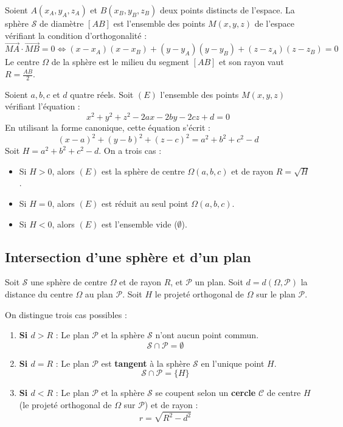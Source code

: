 \begin{theoreme}
Soient $A(x_A, y_A, z_A)$ et $B(x_B, y_B, z_B)$ deux points distincts de l'espace.
La sphère $\mathcal{S}$ de diamètre $[AB]$ est l'ensemble des points $M(x, y, z)$ de l'espace vérifiant la condition d'orthogonalité :
\[
\vec{MA} \cdot \vec{MB} = 0 \iff (x - x_A)(x - x_B) + (y - y_A)(y - y_B) + (z - z_A)(z - z_B) = 0
\]
Le centre $\Omega$ de la sphère est le milieu du segment $[AB]$ et son rayon vaut $R = \frac{AB}{2}$.
\end{theoreme}

\begin{propriete}[Détermination géométrique de l'ensemble $x^2 + y^2 + z^2 - 2ax - 2by - 2cz + d = 0$]
Soient $a, b, c$ et $d$ quatre réels. Soit $(E)$ l'ensemble des points $M(x, y, z)$ vérifiant l'équation :
\[
x^2 + y^2 + z^2 - 2ax - 2by - 2cz + d = 0
\]
En utilisant la forme canonique, cette équation s'écrit :
\[
(x - a)^2 + (y - b)^2 + (z - c)^2 = a^2 + b^2 + c^2 - d
\]
Soit $H = a^2 + b^2 + c^2 - d$. On a trois cas :
\begin{itemize}
    \item Si $H > 0$, alors $(E)$ est la sphère de centre $\Omega(a, b, c)$ et de rayon $R = \sqrt{H}$.
    \item Si $H = 0$, alors $(E)$ est réduit au seul point $\Omega(a, b, c)$.
    \item Si $H < 0$, alors $(E)$ est l'ensemble vide ($\emptyset$).
\end{itemize}
\end{propriete}

\subsection{Intersection d'une sphère et d'un plan}

Soit $\mathcal{S}$ une sphère de centre $\Omega$ et de rayon $R$, et $\mathcal{P}$ un plan. Soit $d = d(\Omega, \mathcal{P})$ la distance du centre $\Omega$ au plan $\mathcal{P}$.
Soit $H$ le projeté orthogonal de $\Omega$ sur le plan $\mathcal{P}$.

\begin{theoreme}
On distingue trois cas possibles :
\begin{enumerate}
    \item \textbf{Si $d > R$} : Le plan $\mathcal{P}$ et la sphère $\mathcal{S}$ n'ont aucun point commun.
    \[
    \mathcal{S} \cap \mathcal{P} = \emptyset
    \]
    \item \textbf{Si $d = R$} : Le plan $\mathcal{P}$ est \textbf{tangent} à la sphère $\mathcal{S}$ en l'unique point $H$.
    \[
    \mathcal{S} \cap \mathcal{P} = \{H\}
    \]
    \item \textbf{Si $d < R$} : Le plan $\mathcal{P}$ et la sphère $\mathcal{S}$ se coupent selon un \textbf{cercle} $\mathcal{C}$ de centre $H$ (le projeté orthogonal de $\Omega$ sur $\mathcal{P}$) et de rayon :
    \[
    r = \sqrt{R^2 - d^2}
    \]
\end{enumerate}
\end{theoreme}

